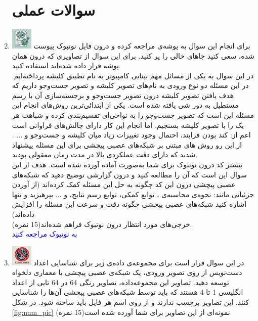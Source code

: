 \documentclass[12pt]{article}
\begin{document}
\begin{enumerate}
    \section*{سوالات عملی} 
    \item \includegraphics[width=1cm]{figs/Allowed_with_contributino.jpg}
    برای انجام این سوال به پوشه‌ی  مراجعه کرده و درون فایل نوتبوک پیوست شده، سعی کنید جاهای خالی را پر کنید. برای این سوال از تصاویری که درون همان پوشه قرار داده شده‌اند استفاده کنید.\\
    در این سوال به یکی از مسائل مهم بینایی کامپیوتر به نام تطبیق کلیشه پرداخته‌ایم. در این مسئله دو نوع ورودی به نام‌های تصویر کلیشه و تصویر جست‌وجو داریم که هدف یافتن تصویر کلیشه درون تصویر جست‌وجو و برجسته‌سازی آن با رسم مستطیل به دور شی یافته شده است. یکی از ابتدائی‌ترین روش‌های انجام این مسئله این است که تصویر جست‌وجو را به نواحی‌ای تقسیم‌بندی کرده و شباهت هر یک را با تصویر کلیشه بسنجیم. اما انجام این کار دارای چالش‌های فراوانی است اعم از: کند بودن فرایند، احتمال وجود تغییرات زیاد میان کلیشه و جست‌وجو و ... . از این رو روش های مبتنی بر شبکه‌های عصبی پیچشی برای این مسئله پیشنهاد شدند که دارای دقت عملکردی بالا در مدت زمان معقولی بودند.\\
    بیشتر کد درون نوتبوک برای شما به‌صورت آماده آورده شده است. هدف از این سوال این است که آن را مطالعه کنید و درون گزارشی توضیح دهید که شبکه‌های عصبی پیچشی درون این کد چگونه به حل این مسئله کمک کرده‌اند (از آوردن جزئیاتی مانند: نحوه‌ی محاسبه‌ی ، توابع کمکی، توابع رسم نتایج،  و ... بپرهیزید و تنها اشاره کنید شبکه‌های عصبی پیچشی چگونه دقت و سرعت این مسئله را افزایش داده‌اند)\\
    خرجی‌های مورد انتظار درون نوتبوک فراهم شده‌اند(15 نمره).\\
    \textcolor{blue}{
    به نوتبوک  مراجعه کنید
    }

    \item \includegraphics[width=1cm]{figs/Forbidden_AI.jpg}
    در این سوال قرار است برای مجموعه‌ی داده‌ی زیر برای شناسایی اعداد دست‌نویس از روی تصویر ورودی، یک شبکه‌ی عصبی پیچشی با معماری دلخواه توسعه دهید. تصاویر این مجموعه‌داده، تصاویر رنگی 64 در 64 تایی از اعداد انگلیسی 1 تا 4 هستند که باید توسط شبکه‌های عصبی پیچشی آن‌ها را شناسایی کنند. این تصاویر برچسب ندارند و از روی اسم هر فایل باید ساخته شود. در شکل \ref{fig:num_pic} نمونه‌ای از این تصاویر برای شما آورده شده است(15 نمره)\\
    

\end{enumerate}
\end{document}
